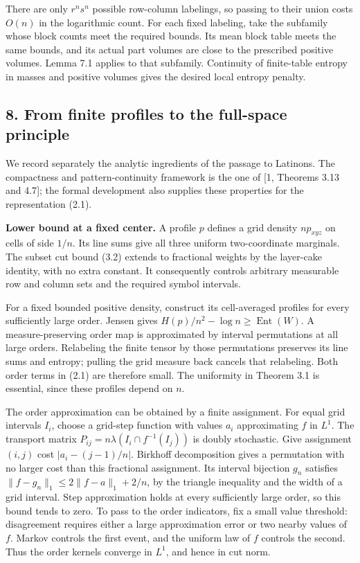 \documentclass[english,11pt,a4paper]{article}
\begin{document}
There are only \(r^ns^n\) possible row-column labelings, so passing to their union costs \(O(n)\) in the logarithmic count. For each fixed labeling, take the subfamily whose block counts meet the required bounds. Its mean block table meets the same bounds, and its actual part volumes are close to the prescribed positive volumes. Lemma 7.1 applies to that subfamily. Continuity of finite-table entropy in masses and positive volumes gives the desired local entropy penalty.

\subsection{8. From finite profiles to the full-space principle}\label{from-finite-profiles-to-the-full-space-principle}

We record separately the analytic ingredients of the passage to Latinons. The compactness and pattern-continuity framework is the one of {[}1, Theorems 3.13 and 4.7{]}; the formal development also supplies these properties for the representation (2.1).

\textbf{Lower bound at a fixed center.} A profile \(p\) defines a grid density \(np_{xyz}\) on cells of side \(1/n\). Its line sums give all three uniform two-coordinate marginals. The subset cut bound (3.2) extends to fractional weights by the layer-cake identity, with no extra constant. It consequently controls arbitrary measurable row and column sets and the required symbol intervals.

For a fixed bounded positive density, construct its cell-averaged profiles for every sufficiently large order. Jensen gives \(H(p)/n^2-\log n\ge\operatorname{Ent}(W)\). A measure-preserving order map is approximated by interval permutations at all large orders. Relabeling the finite tensor by those permutations preserves its line sums and entropy; pulling the grid measure back cancels that relabeling. Both order terms in (2.1) are therefore small. The uniformity in Theorem 3.1 is essential, since these profiles depend on \(n\).

The order approximation can be obtained by a finite assignment. For equal grid intervals \(I_i\), choose a grid-step function with values \(a_i\) approximating \(f\) in \(L^1\). The transport matrix \(P_{ij}=n\lambda(I_i\cap f^{-1}(I_j))\) is doubly stochastic. Give assignment \((i,j)\) cost \(|a_i-(j-1)/n|\). Birkhoff decomposition gives a permutation with no larger cost than this fractional assignment. Its interval bijection \(g_n\) satisfies \(\|f-g_n\|_1\le2\|f-a\|_1+2/n\), by the triangle inequality and the width of a grid interval. Step approximation holds at every sufficiently large order, so this bound tends to zero. To pass to the order indicators, fix a small value threshold: disagreement requires either a large approximation error or two nearby values of \(f\). Markov controls the first event, and the uniform law of \(f\) controls the second. Thus the order kernels converge in \(L^1\), and hence in cut norm.
\end{document}
